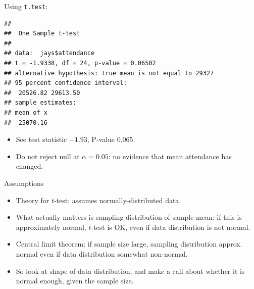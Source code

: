 \documentclass[ignorenonframetext,]{beamer}
\newenvironment{Shaded}{\begin{snugshade}}{\end{snugshade}}
\newcommand{\DataTypeTok}[1]{\textcolor[rgb]{0.13,0.29,0.53}{#1}}
\newcommand{\DecValTok}[1]{\textcolor[rgb]{0.00,0.00,0.81}{#1}}
\newcommand{\KeywordTok}[1]{\textcolor[rgb]{0.13,0.29,0.53}{\textbf{#1}}}
\newcommand{\NormalTok}[1]{#1}
\newcommand{\OperatorTok}[1]{\textcolor[rgb]{0.81,0.36,0.00}{\textbf{#1}}}
\providecommand{\tightlist}{%
  \setlength{\itemsep}{0pt}\setlength{\parskip}{0pt}}
\begin{document}
\begin{frame}[fragile]{Using \texttt{t.test}:}
\protect\hypertarget{using-t.test}{}

\begin{Shaded}
\end{Shaded}

\begin{verbatim}
## 
##  One Sample t-test
## 
## data:  jays$attendance
## t = -1.9338, df = 24, p-value = 0.06502
## alternative hypothesis: true mean is not equal to 29327
## 95 percent confidence interval:
##  20526.82 29613.50
## sample estimates:
## mean of x 
##  25070.16
\end{verbatim}

\begin{itemize}
\tightlist
\item
  See test statistic \(-1.93\), P-value 0.065.
\item
  Do not reject null at \(\alpha=0.05\): no evidence that mean
  attendance has changed.
\end{itemize}

\end{frame}

\begin{frame}{Assumptions}
\protect\hypertarget{assumptions}{}

\begin{itemize}
\tightlist
\item
  Theory for \(t\)-test: assumes normally-distributed data.
\item
  What actually matters is sampling distribution of sample mean: if this
  is approximately normal, \(t\)-test is OK, even if data distribution
  is not normal.
\item
  Central limit theorem: if sample size large, sampling distribution
  approx. normal even if data distribution somewhat non-normal.
\item
  So look at shape of data distribution, and make a call about whether
  it is normal enough, given the sample size.
\end{itemize}

\end{frame}
\end{document}
